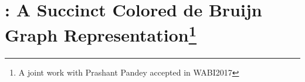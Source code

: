  






%
\chapter{\system: A Succinct Colored de Bruijn Graph Representation\protect\footnote{A joint work with Prashant Pandey accepted in WABI2017}}
\label{sec:rainbowfish}

